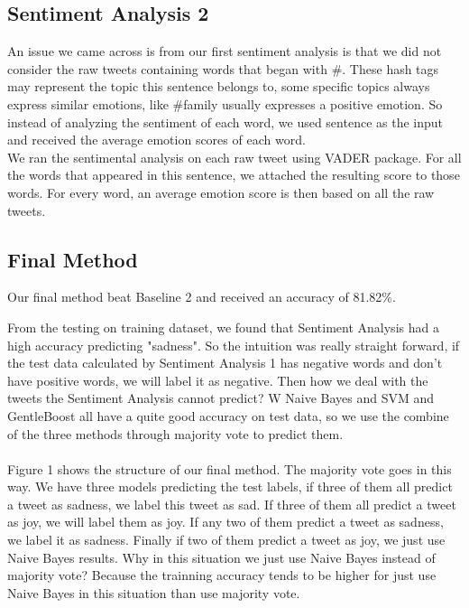 \documentclass[]{article}
\begin{document}
\subsection{Sentiment Analysis 2}

An issue we came across is from our first sentiment analysis is that we did not consider the raw tweets containing words that began with \#. These hash tags may represent the topic this sentence belongs to, some specific topics always express similar emotions, like \#family usually expresses a positive emotion. So instead of analyzing the sentiment of each word, we used sentence as the input and received the average emotion scores of each word.\\

We ran the sentimental analysis on each raw tweet using VADER package. For all the words that appeared in this sentence, we attached the resulting score to those words. For every word, an average emotion score is then based on all the raw tweets. \\ 

\subsection{Final Method}

Our final method beat Baseline 2 and received an accuracy of 81.82\%. 

From the testing on training dataset, we found that Sentiment Analysis had a high accuracy predicting "sadness". So the intuition was really straight forward, if the test data calculated by Sentiment Analysis 1 has negative words and don't have positive words, we will label it as negative. Then how we deal with the tweets the Sentiment Analysis cannot predict? W Naive Bayes and SVM and GentleBoost all have a quite good accuracy on test data, so we use the combine of the three methods through majority vote to predict them.\\\\

Figure 1 shows the structure of our final method. The majority vote goes in this way. We have three models predicting the test labels, if three of them all predict a tweet as sadness, we label this tweet as sad. If three of them all predict a tweet as joy, we will label them as joy. If any two of them predict a tweet as sadness, we label it as sadness. Finally if two of them predict a tweet as joy, we just use Naive Bayes results. Why in this situation we just use Naive Bayes instead of majority vote? Because the trainning accuracy tends to be higher for just use Naive Bayes in this situation than use majority vote.\\\\
\end{document}
